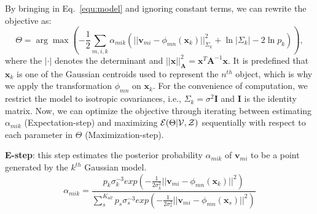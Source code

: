 By bringing in Eq.~\ref{equ:model} and ignoring constant terms, we can rewrite the objective as:
\begin{equation}
\label{equ:obj3}
\Theta=\arg\max(-\frac{1}{2}\sum_{m,i,k}\alpha_{mik}(||\mathbf{v}_{mi}-\phi_{mn}(\mathbf{x}_k)||_{\Sigma_k}^2 + \ln |\Sigma_k| - 2\ln p_k)), 
\end{equation}
%
where the $|\cdot|$ denotes the determinant and $||\mathbf{x}||_{\mathbf{A}}^2= \mathbf{x}^T\mathbf{A}^{-1}\mathbf{x}$. 
%
It is predefined that $\mathbf{x}_k$ is one of the Gaussian centroids used to represent the $n^{th}$ object, which is why we apply the transformation $\phi_{mn}$ on $\mathbf{x}_k$. 
%
For the convenience of computation, we restrict the model to isotropic covariances, i.e., $\Sigma_k=\sigma^2\mathbf{I}$ and $\mathbf{I}$ is the identity matrix.
%
Now, we can optimize the objective through iterating between estimating $\alpha_{mik}$ (Expectation-step) and maximizing $\mathcal{E}(\Theta|\mathcal{V},\mathcal{Z})$ sequentially with respect to each parameter in $\Theta$ (Maximization-step).

\noindent\textbf{E-step}:
this step estimates the posterior probability $\alpha_{mik}$ of $\mathbf v_{mi}$ to be a point generated by the $k^{th}$ Gaussian model.
%
\begin{equation}
\label{equ:estep}
\alpha_{mik}=\frac{p_k\sigma_k^{-3}exp(-\frac{1}{2\sigma_k^2}||\mathbf v_{mi}-\phi_{mn}(\mathbf x_k)||^2)}{\sum_s^{K_{all}}p_s\sigma_s^{-3}exp(-\frac{1}{2\sigma_s^2}||\mathbf v_{mi}-\phi_{mn}(\mathbf x_s)||^2)}
\end{equation}
%

